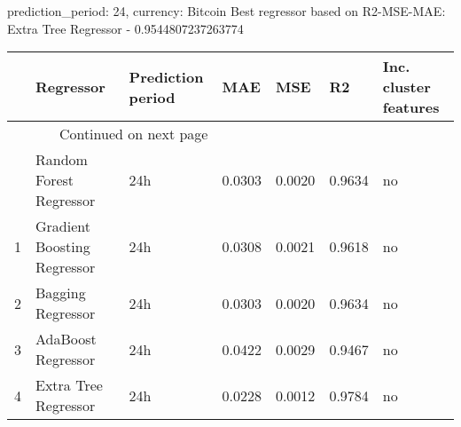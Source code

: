 
prediction_period: 24, currency: Bitcoin
Best regressor based on R2-MSE-MAE: Extra Tree Regressor - 0.9544807237263774
\begin{longtable}{lllllll}
\toprule
{} &                    Regressor & Prediction period &     MAE &     MSE &      R2 & Inc. cluster features \\
\midrule
\endhead
\midrule
\multicolumn{3}{r}{{Continued on next page}} \\
\midrule
\endfoot

\bottomrule
\endlastfoot
0 &      Random Forest Regressor &               24h &  0.0303 &  0.0020 &  0.9634 &                    no \\
1 &  Gradient Boosting Regressor &               24h &  0.0308 &  0.0021 &  0.9618 &                    no \\
2 &            Bagging Regressor &               24h &  0.0303 &  0.0020 &  0.9634 &                    no \\
3 &           AdaBoost Regressor &               24h &  0.0422 &  0.0029 &  0.9467 &                    no \\
4 &         Extra Tree Regressor &               24h &  0.0228 &  0.0012 &  0.9784 &                    no \\
\end{longtable}
